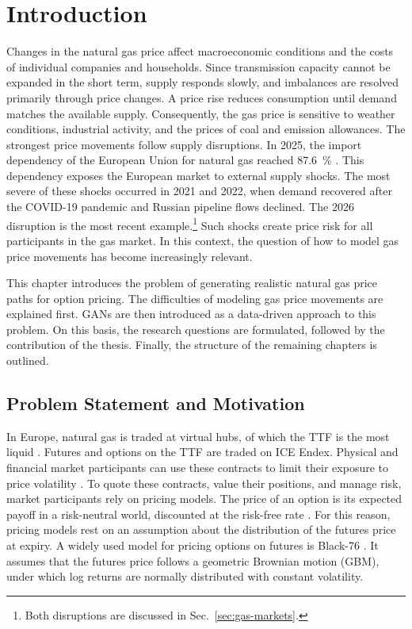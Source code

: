 \section{Introduction}\label{sec:introduction}

Changes in the natural gas price affect macroeconomic conditions and the costs of individual companies and households. Since transmission capacity cannot be expanded in the short term, supply responds slowly, and imbalances are resolved primarily through price changes. A price rise reduces consumption until demand matches the available supply. Consequently, the gas price is sensitive to weather conditions, industrial activity, and the prices of coal and emission allowances. The strongest price movements follow supply disruptions. In 2025, the import dependency of the European Union for natural gas reached \SI{87.6}{\percent} \parencite{eurostatGasSupply2026}. This dependency exposes the European market to external supply shocks. The most severe of these shocks occurred in 2021 and 2022, when demand recovered after the COVID-19 pandemic and Russian pipeline flows declined. The 2026 disruption is the most recent example.\footnote{Both disruptions are discussed in Sec.~\ref{sec:gas-markets}.} Such shocks create price risk for all participants in the gas market. In this context, the question of how to model gas price movements has become increasingly relevant.

This chapter introduces the problem of generating realistic natural gas price paths for option pricing. The difficulties of modeling gas price movements are explained first. GANs are then introduced as a data-driven approach to this problem. On this basis, the research questions are formulated, followed by the contribution of the thesis. Finally, the structure of the remaining chapters is outlined.

\subsection{Problem Statement and Motivation}\label{sec:motivation}
In Europe, natural gas is traded at virtual hubs, of which the TTF is the most liquid \parencite{heatherEuropeanTradedGas2026}. Futures and options on the TTF are traded on ICE Endex. Physical and financial market participants can use these contracts to limit their exposure to price volatility \parencite[241]{gemanCommoditiesCommodityDerivatives2005}. To quote these contracts, value their positions, and manage risk, market participants rely on pricing models. The price of an option is its expected payoff in a risk-neutral world, discounted at the risk-free rate \parencite[292]{hullOptionsFuturesOther2022}. For this reason, pricing models rest on an assumption about the distribution of the futures price at expiry. A widely used model for pricing options on futures is Black-76 \parencite{blackPricingCommodityContracts1976}. It assumes that the futures price follows a geometric Brownian motion (GBM), under which log returns are normally distributed with constant volatility. 


